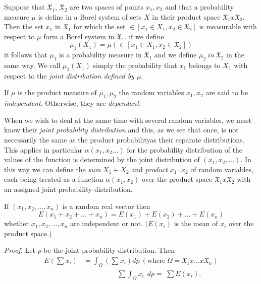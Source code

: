 Suppose that $\mathfrak{X}_1$, $\mathfrak{X}_2$ are two spaces of points
$x_1,x_2$ and that a probability measure $\mu$ is define in a Borel
system of sets $X$ in their product space
$\mathfrak{X}_1 x\mathfrak{X}_2$. Then the set $x_1$ in
$\mathfrak{X}_1$ for which the set $\in [x_1 \in X_1,x_2 \in
 \mathfrak{X}_2]$ is measurable with respect to $\mu$ form a Borel
system in $\mathfrak{X}_1$.  if we define
$$
\mu_1(X_1)=\mu\left(\in\left[x_1\in X_1,x_2 \in \mathfrak{X}_2\right]\right)
$$
it follows that $\mu_1$ is a probability measure in $\mathfrak{X}_1$
and we define $\mu_2  ~in~ \mathfrak{X}_2$ in the same way. We call
$\mu_1(X_1)$ simply the probability that $x_1$ belongs to $X_1$ with
respect to the \textit{joint distribution defined by $\mu$}.

\begin{defi*}
If $\mu$ is the product measure of
  $\mu_1,\mu_2$ the random variables $x_1,x_2$ are said to be
  \textit{independent}. Otherwise, they are \textit{dependant}. 
\end{defi*}

When we wish to deal at the same time with several random variables, we
must know their \textit{joint probability distribution} and this, as we see that
once, is not necessarily the same as the product 
probability\pageoriginale as their separate distributions. This applies in
particular $\alpha (x_1,x_2\ldots)$ for the probability distribution of the
values of the function is determined by the joint distribution of
$(x_1,x_2,\ldots)$. In this way we can define the \textit{sum} $X_1+X_2$ and
\textit{product} $x_1\cdot x_2$ of random variables, each being treated as a
function $\alpha(x_1,x_2)$ over the product space $\mathfrak{X}_1 x
\mathfrak{X}_2$ with an assigned joint probability distribution. 

\begin{theorem}\label{chap2:sec4:thm2} %
  If $(x_1,x_2,...,x_n)$ is a random real vector then
  $$
  E(x_1+x_2+...+x_n)=E(x_1)+E(x_2)+...+E(x_n)
  $$
  whether $x_1,x_2,\ldots ,x_n$ are independent or not. $(E(x_i)$ is the mean
  of $x_i$ over the product space.) 
\end{theorem}

\noindent \textit{Proof.}
  Let $p$ be the joint probability distribution. Then
  \begin{align*}
    E\left(\sum x_i\right) &=\int_\Omega \left(\sum x_i\right) dp
    ~(\text{where}~ \Omega 
    =\mathfrak{X}_1 x\ldots x \mathfrak{X}_n)\\ 
    &\hspace{2cm}\sum \int_\Omega x_i ~~dp=~\sum E(x_i). \tag*{$\Box$}
  \end{align*}


